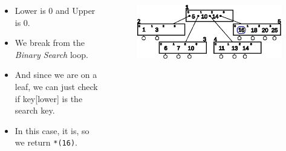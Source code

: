 \documentclass{beamer}
\begin{document}
\begin{frame}[t,allowframebreaks]
    \begin{columns}
        \begin{column}{.4\textwidth}
            \vspace{-1cm}
            \begin{block}{}
                \begin{itemize}
                    \item Lower is 0 and Upper is 0.
                    \item We break from the \emph{Binary Search} loop.
                    \item And since we are on a leaf, we can just check if key[lower] is the search key.
                    \item In this case, it is, so we return \lstinline|*(16)|.
                \end{itemize}
            \end{block}
        \end{column}
        \begin{column}{.6\textwidth}
            \vspace{-1cm}
            \begin{block}{}
                \begin{figure}[h!]
                    \includegraphics[width=\linewidth]{resources/made/btree_search_step6.eps}
                \end{figure}    
                \btreeSearchStepSix
            \end{block}
        \end{column}
    \end{columns}

\end{frame}
\end{document}
